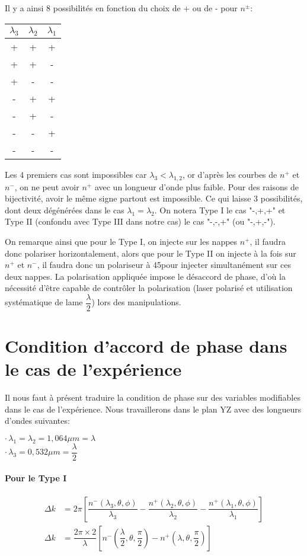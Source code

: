 \documentclass[a4paper,11pt]{report}
\begin{document}
Il y a ainsi 8 possibilités en fonction du choix de + ou de - pour $n^{\pm}$:

\begin{center}
\begin{tabular}{|c|c|c|}
$\lambda_3$&$\lambda_2$&$\lambda_1$\\
\hline
+&+&+\\
+&+&-\\
+&-&-\\
\hline
-&+&+\\
-&+&-\\
-&-&+\\
\hline
-&-&-\\
\end{tabular}
\end{center}

Les 4 premiers cas sont impossibles car $\lambda_3<\lambda_{1,2}$, or d'après les courbes de $n^+$ et $n^-$, on ne peut avoir $n^+$ avec un longueur d'onde plus faible. Pour des raisons de bijectivité, avoir le même signe partout est impossible. Ce qui laisse 3 possibilités, dont deux dégénérées dans le cas $\lambda_1=\lambda_2$. On notera Type I le cas "-,+,+" et Type II (confondu avec Type III dans notre cas) le cas "-,-,+" (ou "-,+,-").

On remarque ainsi que pour le Type I, on injecte sur les nappes $n^+$, il faudra donc polariser horizontalement, alors que pour le Type II on injecte à la fois sur $n^+$ et $n^-$, il faudra donc un polariseur à 45\textdegree pour injecter simultanément sur ces deux nappes. La polarisation appliquée impose le désaccord de phase, d'où la nécessité d'être capable de contrôler la polarisation (laser polarisé et utilisation systématique de lame $\dfrac{\lambda}{2}$) lors des manipulations.

\section{Condition d'accord de phase dans le cas de l'expérience}

Il nous faut à présent traduire la condition de phase sur des variables modifiables dans le cas de l'expérience. Nous travaillerons dans le plan YZ avec des longueurs d'ondes suivantes:

\indent$\cdot\,\lambda_1=\lambda_2=1,064\mu m=\lambda$\\
\indent$\cdot\,\lambda_3=0,532\mu m=\dfrac{\lambda}{2}$\\

\paragraph{Pour le Type I}
\begin{align*}
\Delta k&=2\pi\left[\dfrac{n^-(\lambda_3,\theta,\phi)}{\lambda_3}-\dfrac{n^+(\lambda_2,\theta,\phi)}{\lambda_2}-\dfrac{n^+(\lambda_1,\theta,\phi)}{\lambda_1}\right]\\
\Delta k&=\dfrac{2\pi\times 2}{\lambda}\left[n^-\left(\dfrac{\lambda}{2},\theta,\dfrac{\pi}{2}\right)-n^+\left(\lambda,\theta,\dfrac{\pi}{2}\right)\right]
\end{align*}
\end{document}
